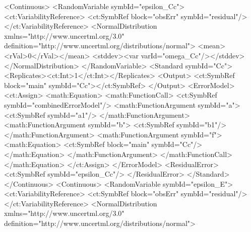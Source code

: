 \documentclass[a4paper,11pt]{article}
\begin{document}
\begin{xmlcode}
            <Continuous>
                <RandomVariable symbId="epsilon_Cc">
                    <ct:VariabilityReference>
                        <ct:SymbRef block="obsErr" symbId="residual"/>
                    </ct:VariabilityReference>
                    <NormalDistribution xmlns="http://www.uncertml.org/3.0"
                        definition="http://www.uncertml.org/distributions/normal">
                        <mean><rVal>0</rVal></mean>
                        <stddev><var varId="omega_Cc"/></stddev>
                    </NormalDistribution>
                </RandomVariable>
                <Standard symbId="Cc">
                    <Replicates><ct:Int>1</ct:Int></Replicates>
                    <Output>
                        <ct:SymbRef block="main" symbId="Cc"></ct:SymbRef>
                    </Output>
                    <ErrorModel>
                        <ct:Assign>
                            <math:Equation>
                                <math:FunctionCall>
                                    <ct:SymbRef symbId="combinedErrorModel"/>
                                    <math:FunctionArgument symbId="a">
                                        <ct:SymbRef symbId="a1"/>
                                    </math:FunctionArgument>
                                    <math:FunctionArgument symbId="b">
                                        <ct:SymbRef symbId="b1"/>
                                    </math:FunctionArgument>
                                    <math:FunctionArgument symbId="f">
                                        <math:Equation>
                                            <ct:SymbRef block="main" symbId="Cc"/>
                                        </math:Equation>
                                    </math:FunctionArgument>
                                </math:FunctionCall>
                            </math:Equation>
                        </ct:Assign>
                    </ErrorModel>
                    <ResidualError>
                        <ct:SymbRef symbId="epsilon_Cc"/>
                    </ResidualError>
                </Standard>
            </Continuous>
            <Continuous>
                <RandomVariable symbId="epsilon_E">
                    <ct:VariabilityReference>
                        <ct:SymbRef block="obsErr" symbId="residual"/>
                    </ct:VariabilityReference>
                    <NormalDistribution xmlns="http://www.uncertml.org/3.0"
                        definition="http://www.uncertml.org/distributions/normal">

\end{xmlcode}
\end{document}
